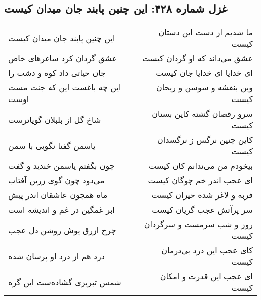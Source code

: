 \begin{center}
\section*{غزل شماره ۴۲۸: این چنین پابند جان میدان کیست}
\label{sec:0428}
\begin{longtable}{l p{0.5cm} r}
این چنین پابند جان میدان کیست
&&
ما شدیم از دست این دستان کیست
\\
عشق گردان کرد ساغرهای خاص
&&
عشق می‌داند که او گردان کیست
\\
جان حیاتی داد کوه و دشت را
&&
ای خدایا ای خدایا جان کیست
\\
این چه باغست این که جنت مست اوست
&&
وین بنفشه و سوسن و ریحان کیست
\\
شاخ گل از بلبلان گویاترست
&&
سرو رقصان گشته کاین بستان کیست
\\
یاسمن گفتا نگویی با سمن
&&
کاین چنین نرگس ز نرگسدان کیست
\\
چون بگفتم یاسمن خندید و گفت
&&
بیخودم من می‌ندانم کان کیست
\\
می‌دود چون گوی زرین آفتاب
&&
ای عجب اندر خم چوگان کیست
\\
ماه همچون عاشقان اندر پیش
&&
فربه و لاغر شده حیران کیست
\\
ابر غمگین در غم و اندیشه است
&&
سر پرآتش عجب گریان کیست
\\
چرخ ازرق پوش روشن دل عجب
&&
روز و شب سرمست و سرگردان کیست
\\
درد هم از درد او پرسان شده
&&
کای عجب این درد بی‌درمان کیست
\\
شمس تبریزی گشاده‌ست این گره
&&
ای عجب این قدرت و امکان کیست
\\
\end{longtable}
\end{center}
